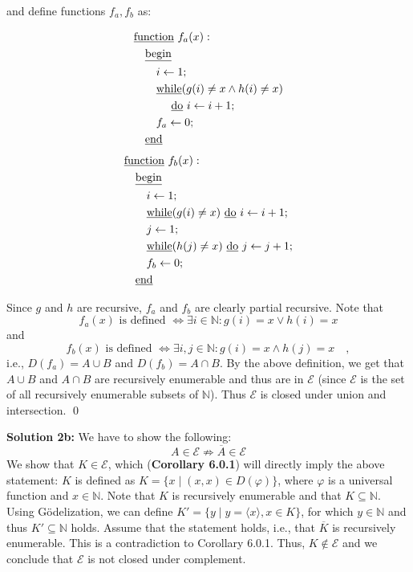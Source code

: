 \documentclass [11pt]{article}
\newcommand{\E}{\ensuremath{\mathcal{E}}}
\newcommand{\N}{\ensuremath{\mathbb{N}}}
\begin{document}
\noindent
and define functions $f_a, f_b$ as:
\begin{multicols}{2}
\noindent
\begin{align*}
& \text{\underline{function} } f_a(x): \\
& \quad \text{\underline{begin}} \\
& \quad \quad i \leftarrow 1; \\
& \quad \quad \text{\underline{while}} (g(i) \neq x \land h(i) \neq x) \\
& \quad \quad \quad \text{ \underline{do} } i \leftarrow i +1; \\
& \quad \quad f_a \leftarrow 0; \\
& \quad \text{\underline{end}}
\end{align*}
\begin{align*}
& \text{\underline{function} } f_b(x): \\
& \quad \text{\underline{begin}} \\
& \quad \quad i \leftarrow 1; \\
& \quad \quad \text{\underline{while}} (g(i) \neq x) \text{ \underline{do} } i \leftarrow i + 1; \\
& \quad \quad j \leftarrow 1; \\
& \quad \quad \text{\underline{while}} (h(j) \neq x) \text{ \underline{do} } j \leftarrow j + 1; \\
& \quad \quad f_b \leftarrow 0; \\
& \quad \text{\underline{end}}
\end{align*}
\end{multicols}
\noindent
Since $g$ and $h$ are recursive, $f_a$ and $f_b$ are clearly partial recursive. 
Note that 
$$
f_a(x) \text{ is defined } \iff \exists i \in \N: g(i) = x \lor h(i) = x
$$
and 
$$
f_b(x) \text{ is defined } \iff \exists i,j \in \N: g(i) = x \land h(j) = x \quad ,
$$
i.e., $D(f_a) = A \cup B$ and $D(f_b) = A \cap B$.
By the above definition, we get that $A\cup B$ and $A \cap B$ are recursively enumerable and thus are in $\E$ (since $\E$ is the set of all recursively enumerable subsets of \N). 
Thus $\E$ is closed under union and intersection. \qed

\bigskip
\noindent
\textbf{Solution 2b:}
We have to show the following:
$$
A \in \E \not \Rightarrow \overline{A} \in \E
$$
We show that $K \in \E$, which (\textbf{Corollary 6.0.1}) will directly imply the above statement:
$K$ is defined as $ K = \{x\mid (x,x) \in D(\varphi) \}$, where $\varphi$ is a universal function and $x \in \N$. 
Note that $K$ is recursively enumerable and that $K \subseteq \N$. 
Using G\"odelization, we can define $K' = \{y \mid y = \langle x\rangle, x \in K \}$, for which $y \in \N$ and thus $K'\subseteq \N$ holds.
Assume that the statement holds, i.e., that $\overline{K}$ is recursively enumerable. 
This is a contradiction to Corollary 6.0.1.
Thus, $K \not \in \E$ and we conclude that $\E$ is not closed under complement.
\end{document}
